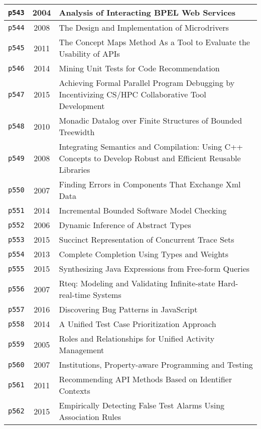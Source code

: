 \begin{longtable}{| c | c | p{16cm} |}
  \hline
  \texttt{p543} & 2004 & Analysis of Interacting BPEL Web Services \\
  \hline
  \texttt{p544} & 2008 & The Design and Implementation of Microdrivers \\
  \hline
  \texttt{p545} & 2011 & The Concept Maps Method As a Tool to Evaluate the Usability of APIs \\
  \hline
  \texttt{p546} & 2014 & Mining Unit Tests for Code Recommendation \\
  \hline
  \texttt{p547} & 2015 & Achieving Formal Parallel Program Debugging by Incentivizing CS/HPC Collaborative Tool Development \\
  \hline
  \texttt{p548} & 2010 & Monadic Datalog over Finite Structures of Bounded Treewidth \\
  \hline
  \texttt{p549} & 2008 & Integrating Semantics and Compilation: Using C++ Concepts to Develop Robust and Efficient Reusable Libraries \\
  \hline
  \texttt{p550} & 2007 & Finding Errors in Components That Exchange Xml Data \\
  \hline
  \texttt{p551} & 2014 & Incremental Bounded Software Model Checking \\
  \hline
  \texttt{p552} & 2006 & Dynamic Inference of Abstract Types \\
  \hline
  \texttt{p553} & 2015 & Succinct Representation of Concurrent Trace Sets \\
  \hline
  \texttt{p554} & 2013 & Complete Completion Using Types and Weights \\
  \hline
  \texttt{p555} & 2015 & Synthesizing Java Expressions from Free-form Queries \\
  \hline
  \texttt{p556} & 2007 & Rteq: Modeling and Validating Infinite-state Hard-real-time Systems \\
  \hline
  \texttt{p557} & 2016 & Discovering Bug Patterns in JavaScript \\
  \hline
  \texttt{p558} & 2014 & A Unified Test Case Prioritization Approach \\
  \hline
  \texttt{p559} & 2005 & Roles and Relationships for Unified Activity Management \\
  \hline
  \texttt{p560} & 2007 & Institutions, Property-aware Programming and Testing \\
  \hline
  \texttt{p561} & 2011 & Recommending API Methods Based on Identifier Contexts \\
  \hline
  \texttt{p562} & 2015 & Empirically Detecting False Test Alarms Using Association Rules \\

\end{longtable}
